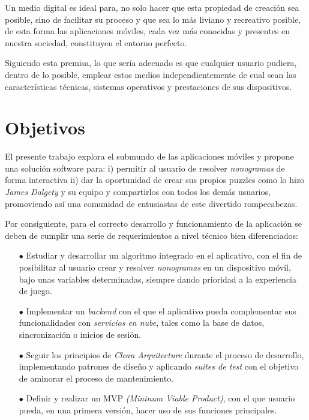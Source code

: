 Un medio digital es ideal para, no solo hacer que esta propiedad de creación sea posible, sino de facilitar su proceso 
y que sea lo más liviano y recreativo posible, de esta forma las aplicaciones móviles, cada vez más conocidas y presentes en nuestra sociedad, constituyen el entorno
perfecto.

Siguiendo esta premisa, lo que sería adecuado es que cualquier usuario pudiera, dentro de lo posible, emplear estos medios
independientemente de cual sean las características técnicas, sistemas operativos y prestaciones de sus dispositivos.

\section{Objetivos}

El presente trabajo explora el submundo de las aplicaciones móviles y propone
una solución software para: i) permitir al usuario de resolver \textit{nonogramas} de forma
interactiva ii) dar la oportunidad de crear sus propios puzzles como lo hizo
\textit{James Dalgety} y su equipo y compartirlos con todos los demás usuarios,
promoviendo así una comunidad de entusiastas de este divertido rompecabezas.

Por consiguiente, para el correcto desarrollo y funcionamiento de la aplicación se deben de
cumplir una serie de requerimientos a nivel técnico bien diferenciados:
\begin{itemize}
   \item[$\bullet$] Estudiar y desarrollar un algoritmo integrado en el aplicativo, con el fin de posibilitar al usuario
   crear y resolver \textit{nonogramas} en un dispositivo móvil, bajo unas variables determinadas, siempre dando prioridad a la experiencia de juego.
   \item[$\bullet$] Implementar un \textit{backend} con el que el aplicativo pueda complementar sus funcionalidades con \textit{servicios en nube},
   tales como la base de datos, sincronización o inicios de sesión.
   \item[$\bullet$] Seguir los principios de \textit{Clean Arquitecture} durante el proceso de desarrollo, implementando patrones de diseño y
   aplicando \textit{suites de test} con el objetivo de aminorar el proceso de mantenimiento.
   \item[$\bullet$] Definir y realizar un MVP \textit{(Mininum Viable Product)}, con el que usuario pueda, en una primera versión,
   hacer uso de sus funciones principales.
\end{itemize}

